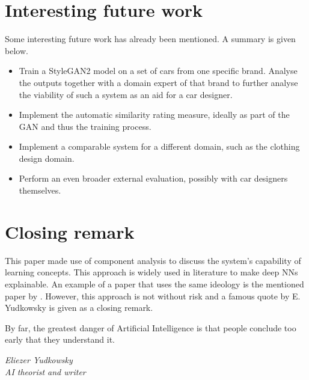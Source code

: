 \section{Interesting future work}
\label{sec:future_work}

Some interesting future work has already been mentioned.
A summary is given below.
\begin{itemize}
    \item Train a StyleGAN2 model on a set of cars from one specific brand. Analyse the outputs together with a domain expert of that brand to further analyse the viability of such a system as an aid for a car designer.
    \item Implement the automatic similarity rating measure, ideally as part of the GAN and thus the training process.
    \item Implement a comparable system for a different domain, such as the clothing design domain.
    \item Perform an even broader external evaluation, possibly with car designers themselves.
\end{itemize}

\section{Closing remark}
\label{sec:closing_remark}

This paper made use of component analysis to discuss the system's capability of learning concepts.
This approach is widely used in literature to make deep NNs explainable.
An example of a paper that uses the same ideology is the mentioned paper by \citet{invidualunitanalysis}.
However, this approach is not without risk and a famous quote by E. Yudkowsky is given as a closing remark.


\epigraph{By far, the greatest danger of Artificial Intelligence is that people conclude too early that they understand it.}
{\textit{Eliezer Yudkowsky \\ AI theorist and writer}}